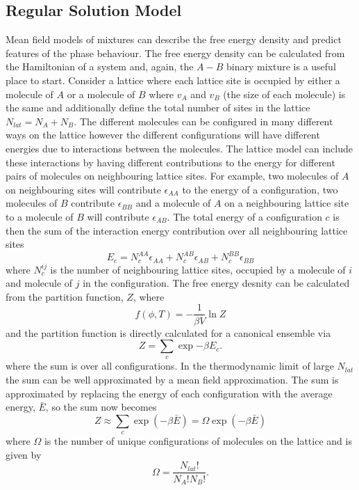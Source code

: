 \subsection{Regular Solution Model}
Mean field models of mixtures can describe the free energy density and predict features of the phase behaviour. The free energy density can be calculated from the Hamiltonian of a system and, again, the $A-B$ binary mixture is a useful place to start. Consider a lattice where each lattice site is occupied by either a molecule of $A$ or a molecule of $B$ where $v_A$ and $v_B$ (the size of each molecule) is the same and additionally define the total number of sites in the lattice $N_{lat} = N_A + N_B$. The different molecules can be configured in many different ways on the lattice however the different configurations will have different energies due to interactions between the molecules. The lattice model can include these interactions by having different contributions to the energy for different pairs of molecules on neighbouring lattice sites. For example, two molecules of $A$ on neighbouring sites will contribute $\epsilon_{AA}$ to the energy of a configuration, two molecules of $B$ contribute $\epsilon_{BB}$ and a molecule of $A$ on a neighbouring lattice site to a molecule of $B$ will contribute $\epsilon_{AB}$. The total energy of a configuration $c$ is then the sum of the interaction energy contribution over all neighbouring lattice sites
\begin{equation}
    E_{c} = N_c^{AA}\epsilon_{AA} + N_c^{AB}\epsilon_{AB} + N_c^{BB}\epsilon_{BB}
\end{equation}
where $N_c^{ij}$ is the number of neighbouring lattice sites, occupied by a molecule of $i$ and molecule of $j$ in the configuration. The free energy desnity can be calculated from the partition function, $Z$, where
\begin{equation}
    f(\phi, T) = -\frac{1}{\beta V}\ln Z
    \label{eq:f_ln}
\end{equation}
 and the partition function is directly calculated for a canonical ensemble via
\begin{equation}
    Z = \sum_c \exp{-\beta E_c}.
\end{equation}
where the sum is over all configurations. In the thermodynamic limit of large $N_{lat}$ the sum can be well approximated by a mean field approximation. The sum is approximated by replacing the energy of each configuration with the average energy, $\bar{E}$, so the sum now becomes
\begin{equation}
    Z \approx \sum_c \exp(-\beta \bar{E}) = \Omega \exp(-\beta \bar{E})
\end{equation}
where $\Omega$ is the number of unique configurations of molecules on the lattice and is given by
\begin{equation}
    \Omega = \frac{N_{lat}!}{N_A! N_B!}.
\end{equation}

